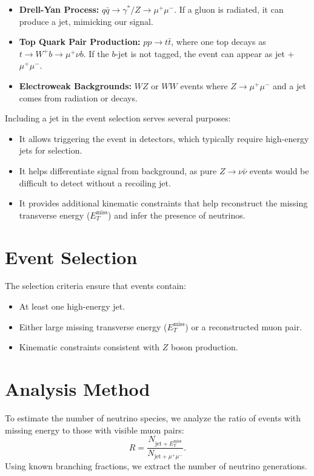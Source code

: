 \begin{itemize}
    \item \textbf{Drell-Yan Process:} $q \bar{q} \to \gamma^*/Z \to \mu^+ \mu^-$. If a gluon is radiated, it can produce a jet, mimicking our signal.
    \item \textbf{Top Quark Pair Production:} $pp \to t \bar{t}$, where one top decays as $t \to W^+ b \to \mu^+ \nu b$. If the $b$-jet is not tagged, the event can appear as jet + $\mu^+ \mu^-$. 
    \item \textbf{Electroweak Backgrounds:} $WZ$ or $WW$ events where $Z \to \mu^+ \mu^-$ and a jet comes from radiation or decays.
\end{itemize}




Including a jet in the event selection serves several purposes:
\begin{itemize}
    \item It allows triggering the event in detectors, which typically require high-energy jets for selection.
    \item It helps differentiate signal from background, as pure $Z \to \nu \bar{\nu}$ events would be difficult to detect without a recoiling jet.
    \item It provides additional kinematic constraints that help reconstruct the missing transverse energy ($E_T^{\text{miss}}$) and infer the presence of neutrinos.
\end{itemize}

\section{Event Selection}
The selection criteria ensure that events contain:
\begin{itemize}
    \item At least one high-energy jet.
    \item Either large missing transverse energy ($E_T^{\text{miss}}$) or a reconstructed muon pair.
    \item Kinematic constraints consistent with $Z$ boson production.
\end{itemize}

\section{Analysis Method}
To estimate the number of neutrino species, we analyze the ratio of events with missing energy to those with visible muon pairs:
\begin{equation}
R = \frac{N_{\text{jet} + E_T^{\text{miss}}}}{N_{\text{jet} + \mu^+ \mu^-}}.
\end{equation}
Using known branching fractions, we extract the number of neutrino generations.
